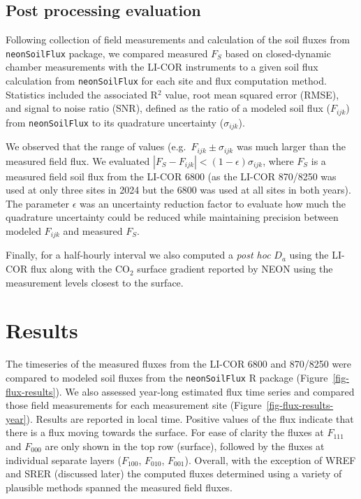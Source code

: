 \documentclass[
  letterpaper,
  DIV=11,
  numbers=noendperiod]{scrartcl}
\begin{document}
\subsection{Post processing evaluation}\label{sec-post-process}

Following collection of field measurements and calculation of the soil
fluxes from \texttt{neonSoilFlux} package, we compared measured
\(F_{S}\) based on closed-dynamic chamber measurements with the LI-COR
instruments to a given soil flux calculation from \texttt{neonSoilFlux}
for each site and flux computation method. Statistics included the
associated R\(^{2}\) value, root mean squared error (RMSE), and signal
to noise ratio (SNR), defined as the ratio of a modeled soil flux
(\(F_{ijk}\)) from \texttt{neonSoilFlux} to its quadrature uncertainty
(\(\sigma_{ijk}\)).

We observed that the range of values (e.g.~\(F_{ijk} \pm \sigma_{ijk}\)
was much larger than the measured field flux. We evaluated
\(| F_{S} - F_{ijk} | < (1-\epsilon) \sigma_{ijk}\), where \(F_{S}\) is
a measured field soil flux from the LI-COR 6800 (as the LI-COR 870/8250
was used at only three sites in 2024 but the 6800 was used at all sites
in both years). The parameter \(\epsilon\) was an uncertainty reduction
factor to evaluate how much the quadrature uncertainty could be reduced
while maintaining precision between modeled \(F_{ijk}\) and measured
\(F_{S}\).

Finally, for a half-hourly interval we also computed a \emph{post hoc}
\(D_{a}\) using the LI-COR flux along with the CO\(_{2}\) surface
gradient reported by NEON using the measurement levels closest to the
surface.

\section{Results}\label{results}

The timeseries of the measured fluxes from the LI-COR 6800 and 870/8250
were compared to modeled soil fluxes from the \texttt{neonSoilFlux} R
package (Figure~\ref{fig-flux-results}). We also assessed year-long
estimated flux time series and compared those field measurements for
each measurement site (Figure~\ref{fig-flux-results-year}). Results are
reported in local time. Positive values of the flux indicate that there
is a flux moving towards the surface. For ease of clarity the fluxes at
\(F_{111}\) and \(F_{000}\) are only shown in the top row (surface),
followed by the fluxes at individual separate layers (\(F_{100}\),
\(F_{010}\), \(F_{001}\)). Overall, with the exception of WREF and SRER
(discussed later) the computed fluxes determined using a variety of
plausible methods spanned the measured field fluxes.
\end{document}
